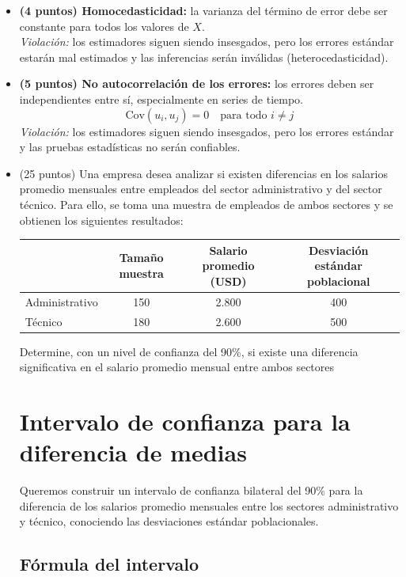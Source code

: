 \documentclass[10pt,a4paper]{article}
\begin{document}
\begin{enumerate}
\begin{itemize}
    \item \textbf{(4 puntos) Homocedasticidad:} la varianza del término de error debe ser constante para todos los valores de \(X\). \\
    \textit{Violación:} los estimadores siguen siendo insesgados, pero los errores estándar estarán mal estimados y las inferencias serán inválidas (heterocedasticidad).

    \item \textbf{(5 puntos) No autocorrelación de los errores:} los errores deben ser independientes entre sí, especialmente en series de tiempo.
    \\
    \[
\mathrm{Cov}(u_i, u_j) = 0 \quad \text{para todo } i \neq j
\]
    \textit{Violación:} los estimadores siguen siendo insesgados, pero los errores estándar y las pruebas estadísticas no serán confiables.


    
\newpage
\item (25 puntos) Una empresa desea analizar si existen diferencias en los salarios promedio mensuales entre empleados del sector administrativo y del sector técnico. Para ello, se toma una muestra de empleados de ambos sectores y se obtienen los siguientes resultados:

\begin{center}
    \begin{tabular}{| l| c | c| c|}
\hline
& Tamaño muestra & Salario promedio (USD) & Desviación estándar poblacional \\ \hline
Administrativo & 150 & 2.800 & 400 \\
Técnico & 180 & 2.600 & 500 \\ \hline
\end{tabular}
\end{center}

Determine, con un nivel de confianza del 90\%, si existe una diferencia significativa en el salario promedio mensual entre ambos sectores

\section*{Intervalo de confianza para la diferencia de medias}

Queremos construir un intervalo de confianza bilateral del 90\% para la diferencia de los salarios promedio mensuales entre los sectores administrativo y técnico, conociendo las desviaciones estándar poblacionales.

\subsection*{Fórmula del intervalo}


\end{itemize}
\end{enumerate}
\end{document}
